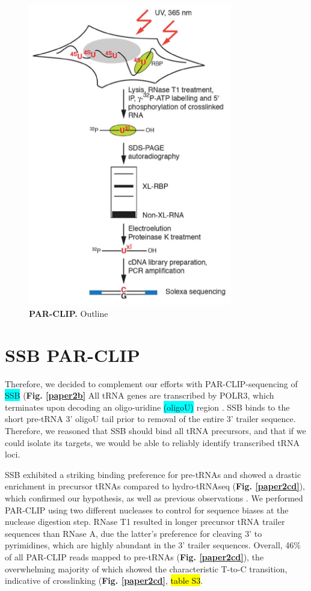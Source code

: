 \documentclass[12pt]{rockefeller}
\newcommand{\cyan}[1]{\colorbox{cyan}{#1}}
\begin{document}
\begin{figure}[!ht]%
\centering
\includegraphics[width=3.5in]{parclip.png}%
\caption[PAR-CLIP]
{\textbf{PAR-CLIP.}
Outline}
\centering
\label{parclip}%
\end{figure}

\section{SSB PAR-CLIP}
Therefore, we decided to complement our efforts with PAR-CLIP-sequencing of \cyan{SSB} (\textbf{Fig. \ref{paper2b}}
All tRNA genes are transcribed by POLR3, which terminates upon decoding an oligo-uridine \cyan{(oligoU)} region \cite{Maraia:2010kx}. SSB binds to the short pre-tRNA 3’ oligoU tail \cite{Stefano:1984wp} prior to removal of the entire 3’ trailer sequence. Therefore, we reasoned that SSB should bind all tRNA precursors, and that if we could isolate its targets, we would be able to reliably identify transcribed tRNA loci. 

SSB exhibited a striking binding preference for pre-tRNAs and showed a drastic enrichment in precursor tRNAs compared to hydro-tRNAseq (\textbf{Fig. \ref{paper2cd}}), which confirmed our hypothesis, as well as previous observations \cite{Bayfield:2009cx}. We performed PAR-CLIP using two different nucleases to control for sequence biases at the nuclease digestion step. RNase T1 resulted in longer precursor tRNA trailer sequences than RNase A, due the latter’s preference for cleaving 3’ to pyrimidines, which are highly abundant in the 3’ trailer sequences. Overall, 46\% of all PAR-CLIP reads mapped to pre-tRNAs (\textbf{Fig. \ref{paper2cd}}), the overwhelming majority of which showed the characteristic T-to-C transition, indicative of crosslinking (\textbf{Fig. \ref{paper2cd}}, \hl{table S3}. 
\end{document}
